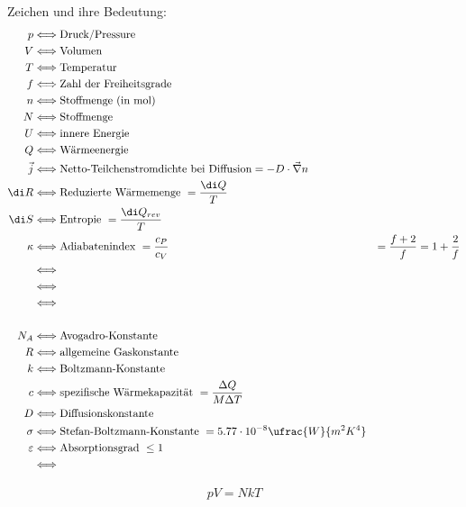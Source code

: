 \documentclass[11pt,letterpaper]{article}
\begin{document}
{{{    Zeichen und ihre Bedeutung:
    \begin{align*}
        p &\Longleftrightarrow \text{Druck/Pressure}\\
        V &\Longleftrightarrow \text{Volumen}\\
        T &\Longleftrightarrow \text{Temperatur}\\
        f &\Longleftrightarrow \text{Zahl der Freiheitsgrade}\\
        n &\Longleftrightarrow \text{Stoffmenge (in mol)}\\
        N &\Longleftrightarrow \text{Stoffmenge}\\
        U &\Longleftrightarrow \text{innere Energie}\\
        Q &\Longleftrightarrow \text{Wärmeenergie}\\
        \vec{j} &\Longleftrightarrow \text{Netto-Teilchenstromdichte bei Diffusion} = -D\cdot \vec{\nabla}n\\
        \di R &\Longleftrightarrow \text{Reduzierte Wärmemenge} \ = \frac{\di Q}{T}\\
        \di S &\Longleftrightarrow \text{Entropie} \ = \frac{\di Q_{rev}}{T}\\
        \kappa &\Longleftrightarrow \text{Adiabatenindex} \ = \frac{c_P}{c_V} &= \frac{f+2}{f}=1+\frac{2}{f}\\
        &\Longleftrightarrow \text{}\\
        &\Longleftrightarrow \text{}\\
        &\Longleftrightarrow \text{}\\
        \\
        N_A &\Longleftrightarrow \text{Avogadro-Konstante}\\
        R &\Longleftrightarrow \text{allgemeine Gaskonstante}\\
        k &\Longleftrightarrow \text{Boltzmann-Konstante}\\
        c &\Longleftrightarrow \text{spezifische Wärmekapazität}\ = \frac{\Delta Q}{M\Delta T}\\
        D &\Longleftrightarrow \text{Diffusionskonstante}\\
        \sigma &\Longleftrightarrow \text{Stefan-Boltzmann-Konstante}\ = 5.77\cdot 10^{-8}\ufrac{W}{m^2K^4}\\
        \varepsilon &\Longleftrightarrow \text{Absorptionsgrad}\ \le 1\\
        &\Longleftrightarrow \text{}\\
    \end{align*}
 }
 }}
 
 \begin{align*}
    p V = N k T
 \end{align*}
 
\end{document}
